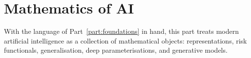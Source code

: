 \part{Mathematics of AI}
\label{part:mathematics-of-ai}

With the language of Part~\ref{part:foundations} in hand, this part treats modern artificial intelligence as a collection of mathematical objects: representations, risk functionals, generalisation, deep parameterisations, and generative models.
